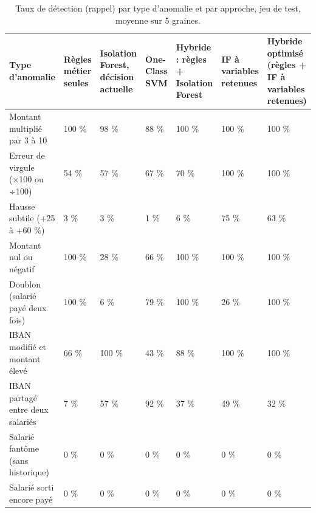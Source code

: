 \begin{table}[htbp]
\centering
\caption{Taux de détection (rappel) par type d'anomalie et par approche, jeu de test, moyenne sur 5 graines.}
\label{tab:detection_par_type_approches}
\small
\begin{tabular}{p{3.6cm}p{1.9cm}p{1.9cm}p{1.9cm}p{1.9cm}p{1.9cm}p{1.9cm}}
\toprule
\textbf{Type d'anomalie} & \textbf{Règles métier seules} & \textbf{Isolation Forest, décision actuelle} & \textbf{One-Class SVM} & \textbf{Hybride : règles + Isolation Forest} & \textbf{IF à variables retenues} & \textbf{Hybride optimisé (règles + IF à variables retenues)} \\
\midrule
Montant multiplié par 3 à 10 & 100 \% & 98 \% & 88 \% & 100 \% & 100 \% & 100 \% \\
Erreur de virgule (×100 ou ÷100) & 54 \% & 57 \% & 67 \% & 70 \% & 100 \% & 100 \% \\
Hausse subtile (+25 à +60 \%) & 3 \% & 3 \% & 1 \% & 6 \% & 75 \% & 63 \% \\
Montant nul ou négatif & 100 \% & 28 \% & 66 \% & 100 \% & 100 \% & 100 \% \\
Doublon (salarié payé deux fois) & 100 \% & 6 \% & 79 \% & 100 \% & 26 \% & 100 \% \\
IBAN modifié et montant élevé & 66 \% & 100 \% & 43 \% & 88 \% & 100 \% & 100 \% \\
IBAN partagé entre deux salariés & 7 \% & 57 \% & 92 \% & 37 \% & 49 \% & 32 \% \\
Salarié fantôme (sans historique) & 0 \% & 0 \% & 0 \% & 0 \% & 0 \% & 0 \% \\
Salarié sorti encore payé & 0 \% & 0 \% & 0 \% & 0 \% & 0 \% & 0 \% \\
\bottomrule
\end{tabular}
\end{table}
